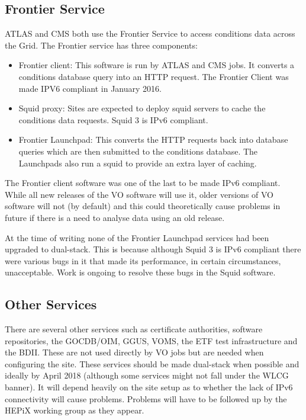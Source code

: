 \documentclass[a4paper]{jpconf}
\begin{document}
\subsection{Frontier Service}
ATLAS and CMS both use the Frontier Service\cite{FrontierATLAS, FrontierCMS} to access
conditions data across the Grid. The Frontier service has three
components:
\begin{itemize}
\item Frontier client: This software is run by ATLAS and CMS jobs. It
  converts a conditions database query into an HTTP request. The
  Frontier Client was made IPV6 compliant in January 2016.
\item Squid proxy: Sites are expected to deploy squid servers to cache
  the conditions data requests. Squid 3 is IPv6 compliant.  
\item Frontier Launchpad: This converts the HTTP requests back into
  database queries which are then submitted to the conditions
  database.  The Launchpads also run a squid to provide an extra layer of caching. 
\end{itemize}
The Frontier client software was one of the last to be made IPv6 compliant.  While all new releases of the VO software will use it, older versions of VO software will not (by default) and this could theoretically cause problems in future if there is a need to analyse data using an old release.

At the time of writing none of the Frontier Launchpad services had been upgraded to dual-stack.  This is because although Squid 3 is IPv6 compliant there were various bugs in it that made its performance, in certain circumstances, unacceptable.  Work is ongoing to resolve these bugs in the Squid software.  

\subsection{Other Services}
There are several other services such as certificate authorities,
software repositories, the GOCDB/OIM, GGUS, VOMS, the ETF test infrastructure and the BDII. These
are not used directly by VO jobs but are needed when configuring the
site.  These services should be made dual-stack when possible and
ideally by April 2018 (although some services might not fall under the
WLCG banner). It will depend heavily on the site setup as to whether
the lack of IPv6 connectivity will cause problems. Problems will have
to be followed up by the HEPiX working group as they appear.
\end{document}
